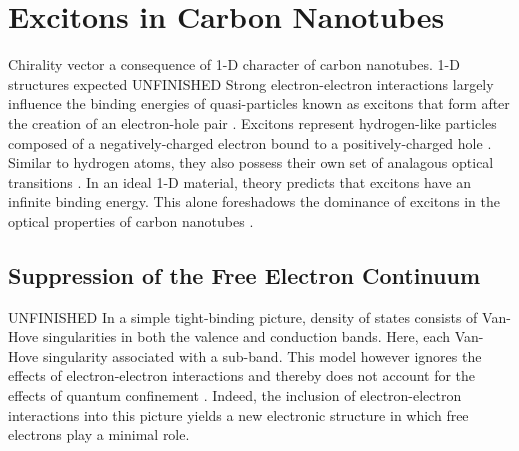 \section{Excitons in Carbon Nanotubes}

Chirality vector a consequence of 1-D character of carbon nanotubes. 1-D structures expected 
{\color{red}UNFINISHED} Strong electron-electron interactions largely influence the binding energies of quasi-particles known as excitons that form after the creation of an electron-hole pair \cite{koch2006semiconductor}. Excitons represent hydrogen-like particles composed of a negatively-charged electron bound to a positively-charged hole \cite{koch2006semiconductor}. Similar to hydrogen atoms, they also possess their own set of analagous optical transitions \cite{koch2006semiconductor}. In an ideal 1-D material, theory predicts that excitons have an infinite binding energy. This alone foreshadows the dominance of excitons in the optical properties of carbon nanotubes \cite{ando2005theory}. 


\subsection{Suppression of the Free Electron Continuum}
{\color{red}UNFINISHED} In a simple tight-binding picture, density of states consists of Van-Hove singularities in both the valence and conduction bands. Here, each Van-Hove singularity associated with a sub-band. This model however ignores the effects of electron-electron interactions and thereby does not account for the effects of quantum confinement \cite{weismanKonoBook}. Indeed, the inclusion of electron-electron interactions into this picture yields a new electronic structure in which free electrons play a minimal role. 
 
